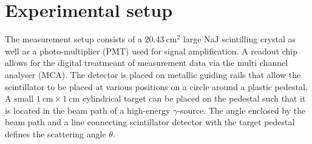 
\section{Experimental setup}
\label{sec:setup}

The measurement setup consists of a $\SI{20.43}{\centi\meter\squared}$
large NaJ scintilling crystal as well as a photo-multiplier (PMT) used for
signal amplification. A readout chip allows for the digital treatmeant of measurement
data via the multi channel analyser (MCA). The detector is placed on metallic guiding rails that allow the scintillator
to be placed at various positions on a circle around a plastic pedestal. A small
$\SI{1}{\centi\meter}\times\SI{1}{\centi\meter}$ cylindrical target can be placed on the
pedestal such that it is located in the beam path of a high-energy $\gamma$-source.
The angle enclosed by the beam path and a line connecting scintillator detector with
the target pedestal defines the scattering angle $\theta$.

